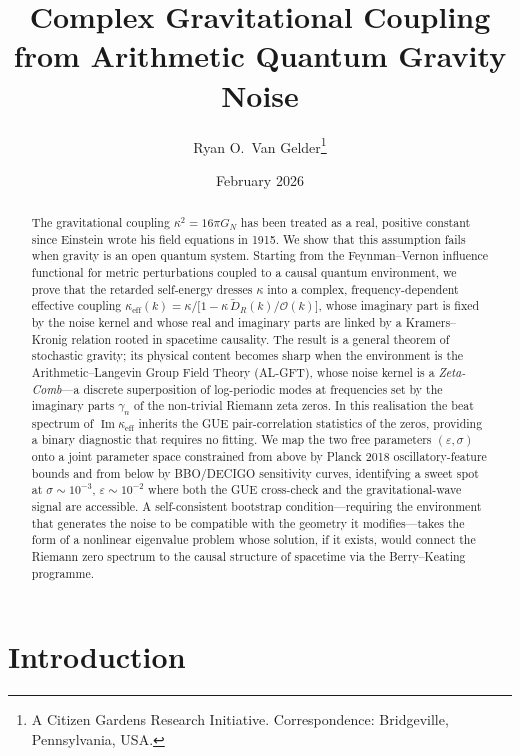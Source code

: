 \documentclass[12pt,a4paper]{article}
\title{\textbf{Complex Gravitational Coupling from Arithmetic Quantum Gravity Noise}}
\author{Ryan O.\ Van Gelder\thanks{A Citizen Gardens Research Initiative.  Correspondence: Bridgeville, Pennsylvania, USA.}}
\date{February 2026}
\begin{document}
\maketitle

\begin{abstract}
The gravitational coupling $\kappa^{2}=16\pi G_{N}$ has been treated as a real, positive constant since Einstein wrote his field equations in 1915.
We show that this assumption fails when gravity is an open quantum system.
Starting from the Feynman--Vernon influence functional for metric perturbations coupled to a causal quantum environment, we prove that the retarded self-energy dresses $\kappa$ into a complex, frequency-dependent effective coupling
$\kappa_{\mathrm{eff}}(k) = \kappa\bigl/\bigl[1-\kappa\,\tilde{D}_{R}(k)/\mathcal{O}(k)\bigr]$,
whose imaginary part is fixed by the noise kernel and whose real and imaginary parts are linked by a Kramers--Kronig relation rooted in spacetime causality.
The result is a general theorem of stochastic gravity; its physical content becomes sharp when the environment is the Arithmetic--Langevin Group Field Theory (AL-GFT), whose noise kernel is a \emph{Zeta-Comb}---a discrete superposition of log-periodic modes at frequencies set by the imaginary parts $\gamma_{n}$ of the non-trivial Riemann zeta zeros.
In this realisation the beat spectrum of $\operatorname{Im}\kappa_{\mathrm{eff}}$ inherits the GUE pair-correlation statistics of the zeros, providing a binary diagnostic that requires no fitting.
We map the two free parameters $(\varepsilon,\sigma)$ onto a joint parameter space constrained from above by Planck 2018 oscillatory-feature bounds and from below by BBO/DECIGO sensitivity curves, identifying a sweet spot at $\sigma\sim 10^{-3}$, $\varepsilon\sim 10^{-2}$ where both the GUE cross-check and the gravitational-wave signal are accessible.
A self-consistent bootstrap condition---requiring the environment that generates the noise to be compatible with the geometry it modifies---takes the form of a nonlinear eigenvalue problem whose solution, if it exists, would connect the Riemann zero spectrum to the causal structure of spacetime via the Berry--Keating programme.
\end{abstract}


\section{Introduction}\label{sec:intro}
\end{document}
